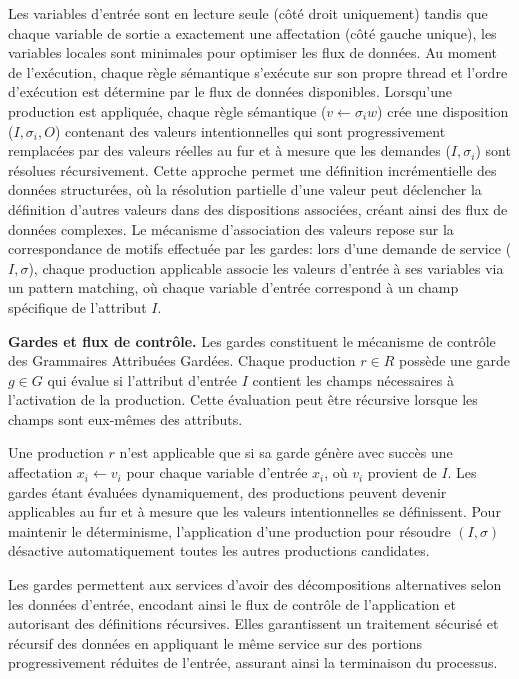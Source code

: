 Les variables d'entrée sont en lecture seule (côté droit uniquement) tandis que chaque variable de sortie a exactement une affectation (côté gauche unique), les variables locales sont minimales pour optimiser les flux de données. Au moment de l’exécution, chaque règle sémantique s'exécute sur son propre thread et l'ordre d’exécution est détermine par le flux de données disponibles. Lorsqu'une production est appliquée, chaque règle sémantique ($v \leftarrow \sigma_i w$) crée une disposition ($I, \sigma_i, O$) contenant des valeurs intentionnelles qui sont progressivement remplacées par des valeurs réelles au fur et à mesure que les demandes ($I, \sigma_i$) sont résolues récursivement. Cette approche permet une définition incrémentielle des données structurées, où la résolution partielle d'une valeur peut déclencher la définition d'autres valeurs dans des dispositions associées, créant ainsi des flux de données complexes. Le mécanisme d'association des valeurs repose sur la correspondance de motifs effectuée par les gardes: lors d'une demande de service ($I, \sigma$), chaque production applicable associe les valeurs d'entrée à ses variables via un pattern matching, où chaque variable d'entrée correspond à un champ spécifique de l'attribut $I$.

\textbf{Gardes et flux de contrôle.}
Les gardes constituent le mécanisme de contrôle des Grammaires Attribuées Gardées. Chaque production $r \in R$ possède une garde $g \in G$ qui évalue si l'attribut d'entrée $I$ contient les champs nécessaires à l'activation de la production. Cette évaluation peut être récursive lorsque les champs sont eux-mêmes des attributs.

Une production $r$ n'est applicable que si sa garde génère avec succès une affectation $x_i \leftarrow v_i$ pour chaque variable d'entrée $x_i$, où $v_i$ provient de $I$. Les gardes étant évaluées dynamiquement, des productions peuvent devenir applicables au fur et à mesure que les valeurs intentionnelles se définissent. Pour maintenir le déterminisme, l'application d'une production pour résoudre $(I, \sigma)$ désactive automatiquement toutes les autres productions candidates.

Les gardes permettent aux services d'avoir des décompositions alternatives selon les données d'entrée, encodant ainsi le flux de contrôle de l'application et autorisant des définitions récursives. Elles garantissent un traitement sécurisé et récursif des données en appliquant le même service sur des portions progressivement réduites de l'entrée, assurant ainsi la terminaison du processus.

